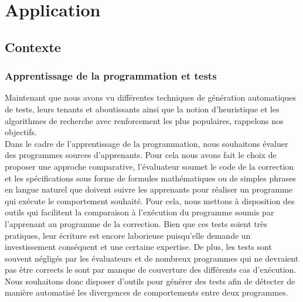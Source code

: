 \chapter{Application}

\label{Chapter2} %

\section{Contexte}

\subsection{Apprentissage de la programmation et tests}
Maintenant que nous avons vu différentes techniques de génération automatiques de tests, leurs tenants et aboutissants ainsi que la notion d'heuristique et les algorithmes de recherche avec renforcement les plus populaires, rappelons nos objectifs.\\

Dans le cadre de l'apprentissage de la programmation, nous souhaitons évaluer des programmes sources d'apprenants. Pour cela nous avons fait le choix de proposer une approche comparative, l'évaluateur soumet le code de la correction et les spécifications sous forme de formules mathématiques ou de simples phrases en langue naturel que doivent suivre les apprenants pour réaliser un programme qui exécute le comportement souhaité.
Pour cela, nous mettons à disposition des outils qui facilitent la comparaison à l'exécution du programme soumis par l'apprenant au programme de la correction.
Bien que ces tests soient très pratiques, leur écriture est encore laborieuse puisqu'elle demande un investissement conséquent et une certaine expertise. De plus, les tests sont souvent négligés par les évaluateurs et de nombreux programmes qui ne devraient pas être corrects le sont par manque de couverture des différents cas d'exécution.
Nous souhaitons donc disposer d'outils pour générer des tests afin de détecter de manière automatisé les divergences de comportements entre deux programmes.

